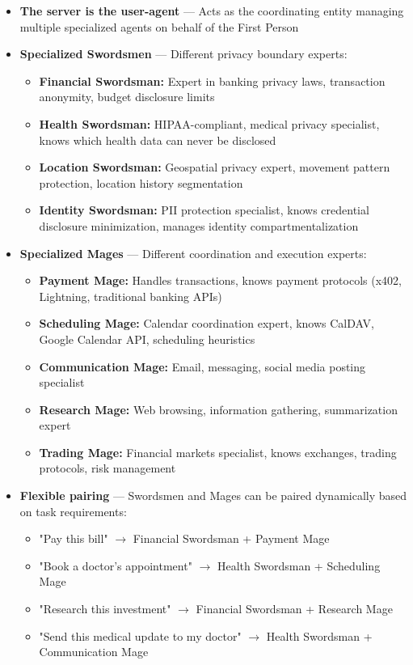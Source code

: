 \documentclass[11pt,a4paper]{article}
\theoremstyle{definition}
\begin{document}
\begin{itemize}
    \item \textbf{The server is the user-agent} --- Acts as the coordinating entity managing multiple specialized agents on behalf of the First Person
    
    \item \textbf{Specialized Swordsmen} --- Different privacy boundary experts:
    \begin{itemize}
        \item \textbf{Financial Swordsman:} Expert in banking privacy laws, transaction anonymity, budget disclosure limits
        \item \textbf{Health Swordsman:} HIPAA-compliant, medical privacy specialist, knows which health data can never be disclosed
        \item \textbf{Location Swordsman:} Geospatial privacy expert, movement pattern protection, location history segmentation
        \item \textbf{Identity Swordsman:} PII protection specialist, knows credential disclosure minimization, manages identity compartmentalization
    \end{itemize}
    
    \item \textbf{Specialized Mages} --- Different coordination and execution experts:
    \begin{itemize}
        \item \textbf{Payment Mage:} Handles transactions, knows payment protocols (x402, Lightning, traditional banking APIs)
        \item \textbf{Scheduling Mage:} Calendar coordination expert, knows CalDAV, Google Calendar API, scheduling heuristics
        \item \textbf{Communication Mage:} Email, messaging, social media posting specialist
        \item \textbf{Research Mage:} Web browsing, information gathering, summarization expert
        \item \textbf{Trading Mage:} Financial markets specialist, knows exchanges, trading protocols, risk management
    \end{itemize}
    
    \item \textbf{Flexible pairing} --- Swordsmen and Mages can be paired dynamically based on task requirements:
    \begin{itemize}
        \item "Pay this bill" $\rightarrow$ Financial Swordsman + Payment Mage
        \item "Book a doctor's appointment" $\rightarrow$ Health Swordsman + Scheduling Mage
        \item "Research this investment" $\rightarrow$ Financial Swordsman + Research Mage
        \item "Send this medical update to my doctor" $\rightarrow$ Health Swordsman + Communication Mage
    \end{itemize}
    

\end{itemize}
\end{document}
